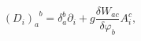 \begin{equation}
\left( D_{i}\right) _{a}^{\;\;b}=\delta _{a}^{b}\partial _{i}+g\frac{\delta
W_{ac}}{\delta \varphi _{b}}A_{i}^{c},  \label{i6}
\end{equation}

